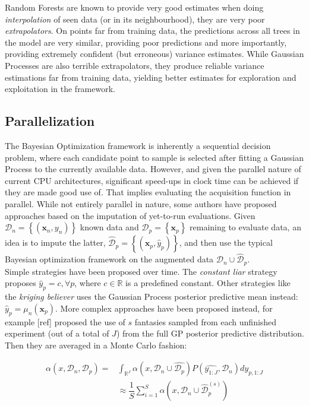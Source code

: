 \documentclass[10pt,a4paper,twoside]{book}
\begin{document}
Random Forests are known to provide very good estimates when doing \textit{interpolation} of seen data (or in its neighbourhood), they are very poor \textit{extrapolators}. On points far from training data, the predictions across all trees in the model are very similar, providing poor predictions and more importantly, providing extremely confident (but erroneous) variance estimates. While Gaussian Processes are also terrible extrapolators, they produce reliable variance estimations far from training data, yielding better estimates for exploration and exploitation in the framework.

\subsection{Parallelization}

The Bayesian Optimization framework is inherently a sequential decision problem, where each candidate point to sample is selected after fitting a Gaussian Process to the currently available data. However, and given the parallel nature of current CPU architectures, significant speed-ups in clock time can be achieved if they are made good use of. That implies evaluating the acquisition function in parallel. While not entirely parallel in nature, some authors have proposed approaches based on the imputation of yet-to-run evaluations. Given $\mathcal{D}_n = \left\lbrace (\boldsymbol{x}_n, y_n) \right\rbrace$ known data and $\mathcal{D}_p = \left\lbrace \boldsymbol{x}_p \right\rbrace$ remaining to evaluate data, an idea is to impute the latter, $\hat{\mathcal{D}}_p = \left\lbrace (\boldsymbol{x}_p, \hat{y}_p) \right\rbrace$, and then use the typical Bayesian optimization framework on the augmented data $\mathcal{D}_n \cup \hat{\mathcal{D}}_p$.\\

Simple strategies have been proposed over time. The \textit{constant liar} strategy proposes $\hat{y}_p = c, \forall p$, where $c \in \mathbb{R}$ is a predefined constant. Other strategies like the \textit{kriging believer} uses the Gaussian Process posterior predictive mean instead: $\hat{y}_p = \mu_n(\boldsymbol{x}_p)$. More complex approaches have been proposed instead, for example [ref] proposed the use of $s$ fantasies sampled from each unfinished experiment (out of a total of $J$) from the full GP posterior predictive distribution. Then they are averaged in a Monte Carlo fashion:

\begin{align}
\alpha(x, \mathcal{D}_n, \mathcal{D}_p) =& \int_{\mathbb{R}^J} \alpha(x, \mathcal{D}_n \cup \hat{\mathcal{D}_p})P(\hat{y_{1:J}}, \mathcal{D}_n) dy_{p, 1:J}\\
&\approx \dfrac{1}{S} \sum_{i=1}^S \alpha(x, \mathcal{D}_n \cup \hat{\mathcal{D}}_p^{(s)})
\end{align} 
\end{document}
